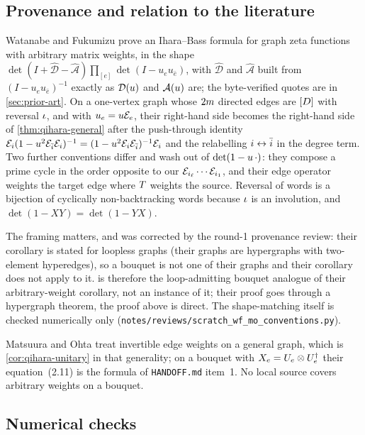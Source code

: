 \subsection{Provenance and relation to the literature}

Watanabe and Fukumizu \cite{watanabe2011zeta} prove an Ihara--Bass formula for graph zeta functions with arbitrary matrix weights, in the
shape $\det(I+\hat{\mathcal D}-\hat{\mathcal A})\prod_{[e]}\det(I-u_eu_{\bar e})$, with $\hat{\mathcal D}$ and $\hat{\mathcal A}$ built from
$(I-u_eu_{\bar e})^{-1}$ exactly as $\mathcal D(u)$ and $\mathcal A(u)$ are; the byte-verified quotes are in \cref{sec:prior-art}. On a one-vertex graph whose
$2m$ directed edges are $[D]$ with reversal $\iota$, and with $u_e = u\mathcal E_{e}$, their right-hand side becomes the right-hand side
of \cref{thm:qihara-general} after the push-through identity $\mathcal E_{i}(1-u^2\mathcal E_{\bar{i}}\mathcal E_{i})^{-1} =
(1-u^2\mathcal E_{i}\mathcal E_{\bar{i}})^{-1}\mathcal E_{i}$ and the relabelling $i\leftrightarrow\bar{i}$ in the degree term. Two further conventions
differ and wash out of $\det(1-u\,\cdot)$: they compose a prime cycle in the order opposite to our $\mathcal E_{i_{\ell}}\cdots\mathcal E_{i_1}$, and
their edge operator weights the target edge where $T$ weights the source. Reversal of words is a bijection of cyclically
non-backtracking words because $\iota$ is an involution, and $\det(1-XY) = \det(1-YX)$.

The framing matters, and was corrected by the round-1 provenance review: their corollary is stated for loopless graphs (their graphs are
hypergraphs with two-element hyperedges), so a bouquet is not one of their graphs and their corollary does not apply to it.
 is therefore the loop-admitting bouquet analogue of their arbitrary-weight corollary, not an instance of it; their
proof goes through a hypergraph theorem, the proof above is direct. The shape-matching itself is checked numerically only
(\texttt{notes/reviews/scratch\_wf\_mo\_conventions.py}).

Matsuura and Ohta \cite{matsuura2022km} treat invertible edge weights on a general graph, which is \cref{cor:qihara-unitary} in that
generality; on a bouquet with $X_e = U_{e}\otimes U_{e}^\dagger$ their equation~(2.11) is the formula of \texttt{HANDOFF.md} item~1. No
local source covers arbitrary weights on a bouquet.

\subsection{Numerical checks}

